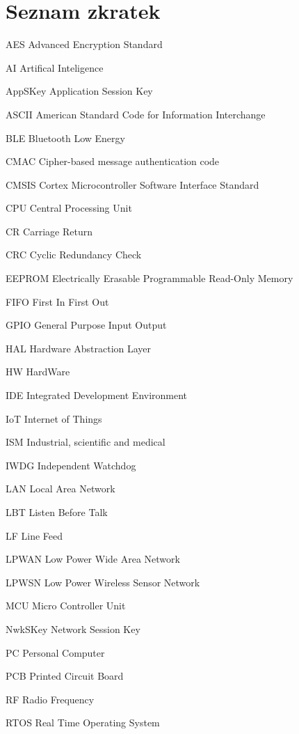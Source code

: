 \documentclass[oneside]{ctuthesis}
\theoremstyle{plain}
\theoremstyle{definition}
\theoremstyle{note}
\newcommand{\abbrlabel}[1]{\makebox[3cm][l]{\textbf{#1}\ \dotfill}}
\newenvironment{abbreviations}{\begin{list}{}{\renewcommand{\makelabel}{\abbrlabel}}}{\end{list}}
\begin{document}
\section{Seznam zkratek}
\begin{abbreviations}
	\item[AES]		Advanced Encryption Standard 
	\item[AI]		Artifical Inteligence
	\item[AppSKey]	Application Session Key	
	\item[ASCII] 	American Standard Code for Information Interchange
	\item[BLE]		Bluetooth Low Energy 
	\item[CMAC]		Cipher-based message authentication code 
	\item[CMSIS]	Cortex Microcontroller Software Interface Standard  
	\item[CPU]		Central Processing Unit
	\item[CR] 		Carriage Return
	\item[CRC] 		Cyclic Redundancy Check
	\item[EEPROM] 	Electrically Erasable Programmable Read-Only Memory
	\item[FIFO]		First In First Out 
	\item[GPIO]		General Purpose Input Output 
	\item[HAL]		Hardware Abstraction Layer 
	\item[HW]		HardWare
	\item[IDE]		Integrated Development Environment 
	\item[IoT] 		Internet of Things
	\item[ISM]		Industrial, scientific and medical 
	\item[IWDG]		Independent Watchdog 
	\item[LAN]		Local Area Network
	\item[LBT]		Listen Before Talk 
	\item[LF]		Line Feed 
	\item[LPWAN]   	Low Power Wide Area Network 
	\item[LPWSN] 	Low Power Wireless Sensor Network	
	\item[MCU] 		Micro Controller Unit
	\item[NwkSKey]	Network Session Key
	\item[PC]		Personal Computer 
	\item[PCB]		Printed Circuit Board 
	\item[RF]		Radio Frequency
	\item[RTOS]		Real Time Operating System 

\end{abbreviations}
\end{document}
